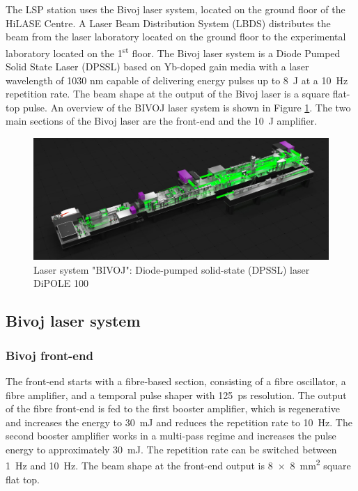 The LSP station uses the Bivoj laser system, located on the ground floor of the HiLASE Centre.  A Laser Beam Distribution System (LBDS) distributes the beam from the laser laboratory located on the ground floor to the experimental laboratory located on the 1\textsuperscript{st} floor. The Bivoj laser system is a Diode Pumped Solid State Laser (DPSSL) based on Yb-doped gain media with a laser wavelength of 1030 nm capable of delivering energy pulses up to \SI{8}{\joule} at a \SI{10}{\hertz} repetition rate. The beam shape at the output of the Bivoj laser is a square flat-top pulse. An overview of the BIVOJ laser system is shown in Figure \ref{fig:bivoj}. The two main sections of the Bivoj laser are the front-end and the \SI{10}{\joule} amplifier.

\begin{figure}[h]
    \centering
    \includegraphics[width=1.0\linewidth]{img/bivoj.jpg}
    \caption{Laser system "BIVOJ": Diode-pumped solid-state (DPSSL) laser DiPOLE 100}
    \label{fig:bivoj}
\end{figure}

\subsection{Bivoj laser system}

\subsubsection*{Bivoj front-end}

The front-end starts with a fibre-based section, consisting
of a fibre oscillator, a fibre amplifier, and a temporal pulse shaper
with \SI{125}{\ps} resolution. The output of the fibre front-end is fed
to the first booster amplifier, which is regenerative and
increases the energy to \SI{30}{\milli\joule} and reduces the repetition rate to \SI{10}{\hertz}. The second booster amplifier works in a multi-pass regime
and increases the pulse energy to approximately \SI{30}{\milli\joule}.
The repetition rate can be switched between \SI{1}{\hertz} and \SI{10}{\hertz}. The
beam shape at the front-end output is \SI{8 x 8}{\mm\squared} square flat top.

